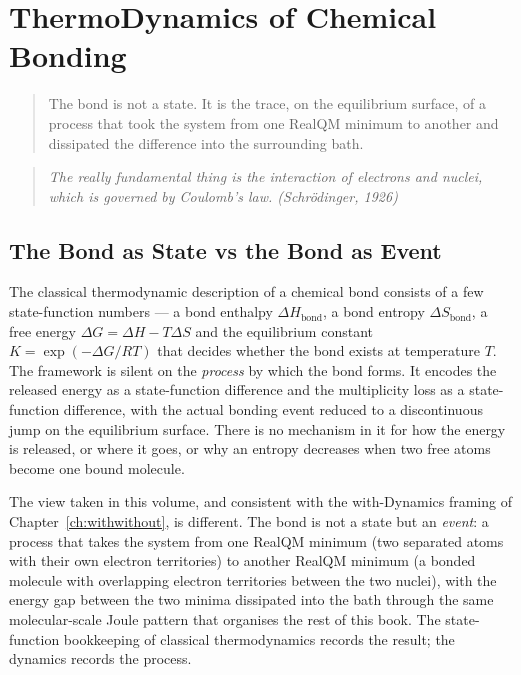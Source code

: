 \chapter{ThermoDynamics of Chemical Bonding}\label{ch:bonding}

\small
\begin{quote}
The bond is not a state. It is the trace, on the equilibrium surface, of a
process that took the system from one RealQM minimum to another and dissipated
the difference into the surrounding bath.
\end{quote}
\begin{quote}
\itshape The really fundamental thing is the interaction of electrons and
nuclei, which is governed by Coulomb's law. (Schr\"odinger, 1926)
\end{quote}
\normalsize

\section{The Bond as State vs the Bond as Event}

The classical thermodynamic description of a chemical bond consists of a few
state-function numbers --- a bond enthalpy $\Delta H_{\mathrm{bond}}$, a bond
entropy $\Delta S_{\mathrm{bond}}$, a free energy $\Delta G = \Delta H -
T\Delta S$ and the equilibrium constant $K = \exp(-\Delta G/RT)$ that decides
whether the bond exists at temperature $T$. The framework is silent on the
\emph{process} by which the bond forms. It encodes the released energy as a
state-function difference and the multiplicity loss as a state-function
difference, with the actual bonding event reduced to a discontinuous jump on
the equilibrium surface. There is no mechanism in it for how the energy is
released, or where it goes, or why an entropy decreases when two free atoms
become one bound molecule.

The view taken in this volume, and consistent with the with-Dynamics framing
of Chapter~\ref{ch:withwithout}, is different. The bond is not a state but
an \emph{event}: a process that takes the system from one RealQM minimum
(two separated atoms with their own electron territories) to another RealQM
minimum (a bonded molecule with overlapping electron territories between the
two nuclei), with the energy gap between the two minima dissipated into the
bath through the same molecular-scale Joule pattern that organises the rest
of this book. The state-function bookkeeping of classical thermodynamics
records the result; the dynamics records the process.

